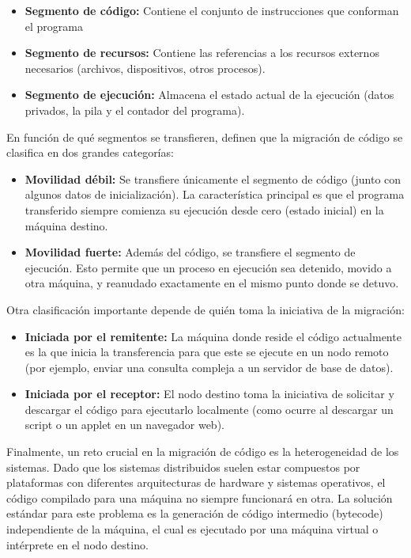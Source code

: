 \begin{itemize}
    \item \textbf{Segmento de código:} Contiene el conjunto de instrucciones que conforman el programa
    \item \textbf{Segmento de recursos:} Contiene las referencias a los recursos externos necesarios (archivos, dispositivos, otros procesos).
    \item \textbf{Segmento de ejecución:} Almacena el estado actual de la ejecución (datos privados, la pila y el contador del programa).
\end{itemize}

En función de qué segmentos se transfieren,  definen que la migración de código se clasifica en dos grandes categorías:

\begin{itemize}
    \item \textbf{Movilidad débil:} Se transfiere únicamente el segmento de código (junto con algunos datos de inicialización). La característica principal es que el programa transferido siempre comienza su ejecución desde cero (estado inicial) en la máquina destino.
    \item \textbf{Movilidad fuerte:} Además del código, se transfiere el segmento de ejecución. Esto permite que un proceso en ejecución sea detenido, movido a otra máquina, y reanudado exactamente en el mismo punto donde se detuvo.
\end{itemize}

Otra clasificación importante depende de quién toma la iniciativa de la migración:

\begin{itemize}
    \item \textbf{Iniciada por el remitente:} La máquina donde reside el código actualmente es la que inicia la transferencia para que este se ejecute en un nodo remoto (por ejemplo, enviar una consulta compleja a un servidor de base de datos).
    \item \textbf{Iniciada por el receptor:} El nodo destino toma la iniciativa de solicitar y descargar el código para ejecutarlo localmente (como ocurre al descargar un script o un applet en un navegador web).
\end{itemize}

Finalmente, un reto crucial en la migración de código es la heterogeneidad de los sistemas. Dado que los sistemas distribuidos suelen estar compuestos por plataformas con diferentes arquitecturas de hardware y sistemas operativos, el código compilado para una máquina no siempre funcionará en otra. La solución estándar para este problema es la generación de código intermedio (bytecode) independiente de la máquina, el cual es ejecutado por una máquina virtual o intérprete en el nodo destino.

